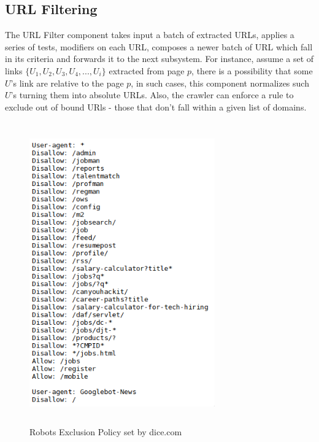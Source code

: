 \subsection{URL Filtering}\label{urlfilter}
The URL Filter\cite{mercator} component takes input a batch of extracted URLs, applies a series of tests, modifiers on each URL, composes a newer batch of URL which fall in its
criteria and forwards it to the next subsystem. For instance, assume a set of links $\{U_1,U_2,U_3,U_4,...,U_i\}$ extracted from page $p$, there is a possibility that some $U$'s link are relative to the page $p$, in
such cases, this component normalizes such $U$'s turning them into absolute URLs. Also, the crawler can
enforce a rule to exclude out of bound URls - those that don't fall within a given list of domains. 

\begin{figure}[h!]
  \centering
  \includegraphics[width=8cm,height=13cm,keepaspectratio]{../media/crawler/robots-txt-sample.png}
  \caption{Robots Exclusion Policy set by dice.com}
  \label{fig:robotsdice}
\end{figure}


